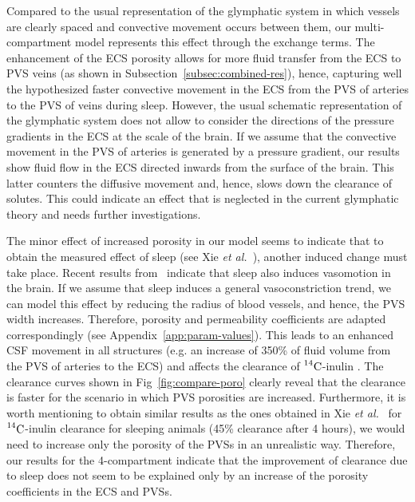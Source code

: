\documentclass[10pt]{article}
\newcommand{\etal}{\emph{et al.}\;}
\newcommand{\1}{^{(1)}}
\newcommand{\2}{^{(2)}}
\newcommand{\Cinulin}{$\prescript{14}{}{\text{C}}$-inulin }
\begin{document}
Compared to the usual representation of the glymphatic system in which vessels are clearly spaced and convective movement occurs between them, our multi-compartment model represents this effect through the exchange terms. 
The enhancement of the ECS porosity allows for more fluid transfer from the ECS to PVS veins (as shown in Subsection~\ref{subsec:combined-res}), hence, capturing well the hypothesized faster convective movement in the ECS from the PVS of arteries to the PVS of veins during sleep. However, the usual schematic representation of the glymphatic system does not allow to consider the directions of the pressure gradients in the ECS at the scale of the brain. If we assume that the convective movement in the PVS of arteries is generated by a pressure gradient, our results show fluid flow in the ECS directed inwards from the surface of the brain. This latter counters the diffusive movement and, hence, slows down the clearance of solutes. This could indicate an effect that is neglected in the current glymphatic theory and needs further investigations. 


The minor effect of increased porosity in our model seems to indicate that to obtain the measured effect of sleep (see Xie \etal~\cite{Xie_2013_sleep}), another induced change must take place. Recent results from~\cite{Bojarskaite2022} indicate that sleep also induces vasomotion in the brain. If we assume that sleep induces a general vasoconstriction trend, we can model this effect by reducing the radius of blood vessels, and hence, the PVS width increases. Therefore, porosity and permeability coefficients are adapted correspondingly (see Appendix~\ref{app:param-values}). This leads to an enhanced CSF movement in all structures (e.g. an increase of 350\% of fluid volume from the PVS of arteries to the ECS) and affects the clearance of \Cinulin. The clearance curves shown in  Fig~\ref{fig:compare-poro} clearly reveal that the clearance is faster for the scenario in which PVS porosities are increased. Furthermore, it is worth mentioning to obtain similar results as the ones obtained in Xie \etal~\cite{Xie_2013_sleep} for \Cinulin clearance for sleeping animals (45\% clearance after 4 hours), we would need to increase only the porosity of the PVSs in an unrealistic way. Therefore, our results for the 4-compartment indicate that the improvement of clearance due to sleep does not seem to be explained only by an increase of the porosity coefficients in the ECS and PVSs. 
\end{document}
